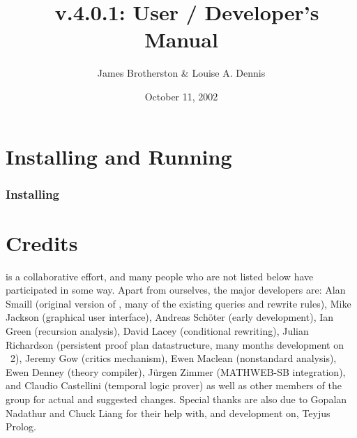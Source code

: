 \documentclass{book}
\begin{document}
\author{James Brotherston \& Louise A. Dennis}
\title{\lclam\ v.4.0.1: User / Developer's Manual}
\date{October 11, 2002}
\maketitle
\tableofcontents


\chapter{Installing and Running \lclam}
\label{install}

\subsection{Installing \lclam {}}











\appendix 




\chapter{Credits}

{\lclam} is a collaborative effort, and many people who are not listed
below have participated in some way. Apart from ourselves, the major
developers are: Alan Smaill (original version of \lclam, many of the
existing queries and rewrite rules), Mike Jackson (graphical user
interface), Andreas Sch\"oter (early \lclam development), Ian Green
(recursion analysis), David Lacey (conditional rewriting), Julian
Richardson (persistent proof plan datastructure, many months
development on \lclam\ 2), Jeremy Gow (critics mechanism), Ewen
Maclean (nonstandard analysis), Ewen Denney (theory compiler),
J\"urgen Zimmer (MATHWEB-SB integration), and Claudio Castellini
(temporal logic prover) as well as other members of the \dream group
for actual and suggested changes.  Special thanks are also due to
Gopalan Nadathur and Chuck Liang for their help with, and development
on, Teyjus Prolog.
 




\end{document}
